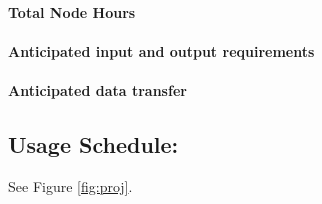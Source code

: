 \documentclass[letterpaper]{article}
\begin{document}
\paragraph{Total Node Hours}
\paragraph{Anticipated input and output requirements}
\paragraph{Anticipated data transfer}




\subsection{Usage Schedule:} See Figure \ref{fig:proj}.

 



\pagebreak


\end{document}
